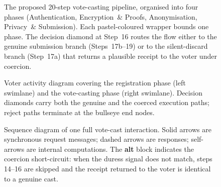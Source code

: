 \begin{figure}[H]
\centering
\resizebox{\textwidth}{!}{}
\caption[Twenty-Step Vote Casting Pipeline]{The proposed 20-step vote-casting pipeline, organised into four phases (Authentication, Encryption~\& Proofs, Anonymisation, Privacy~\& Submission). Each pastel-coloured wrapper bounds one phase. The decision diamond at Step~16 routes the flow either to the genuine submission branch (Steps~17b--19) or to the silent-discard branch (Step~17a) that returns a plausible receipt to the voter under coercion.}
\label{fig:pipeline}
\end{figure}

\begin{figure}[H]
\centering
\resizebox{\textwidth}{!}{}
\caption[Voter Registration and Casting Activity]{Voter activity diagram covering the registration phase (left swimlane) and the vote-casting phase (right swimlane). Decision diamonds carry both the genuine and the coerced execution paths; reject paths terminate at the bullseye end nodes.}
\label{fig:workflow}
\end{figure}

\begin{figure}[H]
\centering
\resizebox{\textwidth}{!}{}
\caption[Vote Casting Sequence Diagram]{Sequence diagram of one full vote-cast interaction. Solid arrows are synchronous request messages; dashed arrows are responses; self-arrows are internal computations. The \textbf{alt} block indicates the coercion short-circuit: when the duress signal does not match, steps 14--16 are skipped and the receipt returned to the voter is identical to a genuine cast.}
\label{fig:sequence}
\end{figure}

